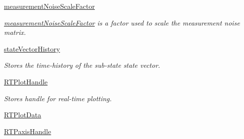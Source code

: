 \begin{DoxyCompactItemize}
\hyperlink{classSignalCorrelationSubstate_1_1CorrelationFilter_a21fc425a1d3bcb40b44afbca1f908de1}{measurement\+Noise\+Scale\+Factor}
\begin{DoxyCompactList}\small\item\em \hyperlink{classSignalCorrelationSubstate_1_1CorrelationFilter_a21fc425a1d3bcb40b44afbca1f908de1}{measurement\+Noise\+Scale\+Factor} is a factor used to scale the measurement noise matrix. \end{DoxyCompactList}\item 
\hyperlink{classSubStates_1_1SubState_a24bf2de56fc3037d91cba43d28f3bf60}{state\+Vector\+History}
\begin{DoxyCompactList}\small\item\em Stores the time-\/history of the sub-\/state state vector. \end{DoxyCompactList}\item 
\hyperlink{classSubStates_1_1SubState_ab92a0fafcfd778b8965e3f649ff94fc7}{R\+T\+Plot\+Handle}
\begin{DoxyCompactList}\small\item\em Stores handle for real-\/time plotting. \end{DoxyCompactList}\item 
\hyperlink{classSubStates_1_1SubState_aae3aa07f0d6f54a510db66e0644c958e}{R\+T\+Plot\+Data}
\item 
\hyperlink{classSubStates_1_1SubState_a41c912457be8682326d60f82cc651207}{R\+T\+Paxis\+Handle}
\end{DoxyCompactItemize}
